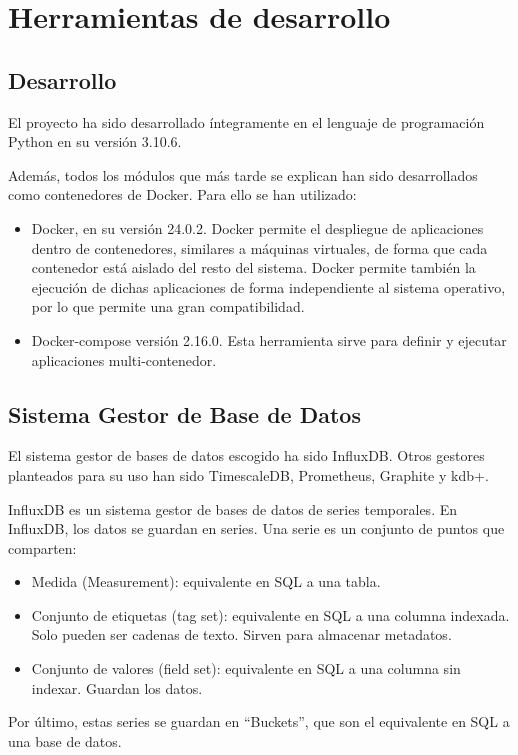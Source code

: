 \section{Herramientas de desarrollo}

\subsection{Desarrollo}

El proyecto ha sido desarrollado íntegramente en el lenguaje de programación Python en su versión 3.10.6.

Además, todos los módulos que más tarde se explican han sido desarrollados como contenedores de Docker. Para ello 
se han utilizado:
\begin{itemize}
    \item Docker, en su versión 24.0.2. Docker permite el despliegue de aplicaciones dentro de contenedores, similares
        a máquinas virtuales, de forma que cada contenedor está aislado del resto del sistema. Docker permite también
        la ejecución de dichas aplicaciones de forma independiente al sistema operativo, por lo que permite una gran 
        compatibilidad. 
    \item Docker-compose versión 2.16.0. Esta herramienta sirve para definir y ejecutar aplicaciones multi-contenedor.
\end{itemize}

\subsection{Sistema Gestor de Base de Datos}

El sistema gestor de bases de datos escogido ha sido InfluxDB. Otros gestores planteados para su uso han sido
TimescaleDB, Prometheus, Graphite y kdb+.

InfluxDB es un sistema gestor de bases de datos de series temporales. En InfluxDB, los datos se guardan en series. 
Una serie es un conjunto de puntos que comparten:
\begin{itemize}
    \item Medida (Measurement): equivalente en SQL a una tabla.
    \item Conjunto de etiquetas (tag set): equivalente en SQL a una columna indexada. Solo pueden ser cadenas de texto.
        Sirven para almacenar metadatos.
    \item Conjunto de valores (field set): equivalente en SQL a una columna sin indexar. Guardan los datos.
\end{itemize}
Por último, estas series se guardan en ``Buckets'', que son el equivalente en SQL a una base de datos.

